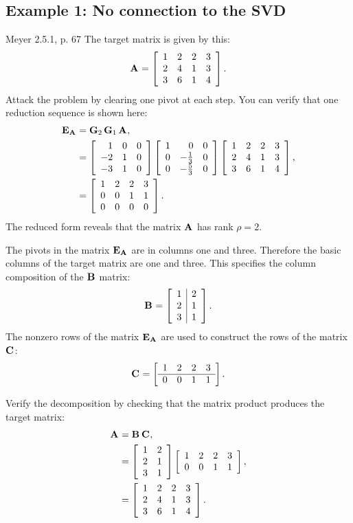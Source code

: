\subsection{Example 1: No connection to the SVD}
Meyer 2.5.1, p. 67
The target matrix is given by this:
\begin{equation}
  \A{} = \mat{cccc}{1&2&2&3 \\ 2&4&1&3 \\ 3&6&1&4}.
\end{equation}
Attack the problem by clearing one pivot at each step. You can verify that one reduction sequence is shown here:
\begin{equation}
\begin{split}
  \E{\A{}} &= \G{2}\,\G{1}\,\A{},\\
 & =
\mat{rrr}{1&0&0 \\ -2&1&0 \\ -3&1&0}
\mat{rrr}{1&0&0 \\ 0&-\frac{1}{3}&0 \\ 0&-\frac{5}{3}&0}
\mat{cccc}{1&2&2&3 \\ 2&4&1&3 \\ 3&6&1&4}, \\
   &= 
\mat{cccc}{1&2&2&3 \\ 0&0&1&1 \\ 0&0&0&0}.
\end{split}
\end{equation}
The reduced form reveals that the matrix $\A{}$ has rank $\rho = 2$.

The pivots in the matrix $\E{\A{}}$ are in columns one and three. Therefore the basic columns of the target matrix are one and three. This specifies the column composition of the $\B{}$ matrix:
\begin{equation}
  \B{} = \mat{c|c}{1&2 \\ 2&1 \\ 3&1}.
\end{equation}
The nonzero rows of the matrix $\E{\A{}}$ are used to construct the rows of the matrix $\C{}$:
\begin{equation}
  \C{} = \mat{cccc}{1&2&2&3 \\ \hline 0&0&1&1}.
\end{equation}
 
Verify the decomposition by checking that the matrix product produces the target matrix:
\begin{equation}
  \begin{split}
    \A{} &= \B{}\,\C{},\\
     &= \mat{cc}{1&2 \\ 2&1 \\ 3&1} \mat{cccc}{1&2&2&3 \\ 0&0&1&1},\\
     &= \mat{cccc}{1&2&2&3 \\ 2&4&1&3 \\ 3&6&1&4}.
  \end{split}
\end{equation}

